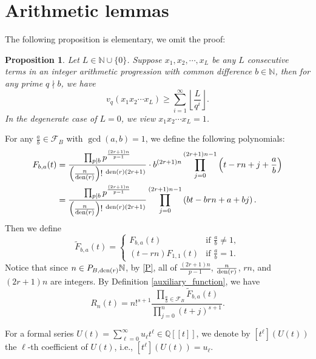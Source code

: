 \documentclass[11pt]{amsart}
\newtheorem{proposition}[theorem]{Proposition}
\numberwithin{equation}{section}
\begin{document}
\section{Arithmetic lemmas}
\label{Arithmetic_lemmas}

The following proposition is elementary, we omit the proof:

\smallskip
\begin{proposition}\label{consecutive_prod}
Let $L \in \mathbb{N} \cup \{ 0 \}$. Suppose $x_1,x_2,\cdots,x_L$ be any $L$ consecutive terms in an integer arithmetic progression with common difference $b \in \mathbb{N}$, then for any prime $q \nmid b$, we have
\[ v_q(x_1x_2\cdots x_L) \geq \sum_{i=1}^{\infty} \left\lfloor \frac{L}{q^i} \right\rfloor .\]
In the degenerate case of $L=0$, we view $x_1x_2\cdots x_L = 1$.
\end{proposition}
\smallskip

For any $\frac{a}{b} \in \mathcal{F}_{B}$ with $\gcd(a,b)=1$, we define the following polynomials:
\begin{align}
F_{b,a}(t) &= \frac{\prod_{p \mid b} p^{\frac{(2r+1)n}{p-1}}}{\left( \frac{n}{{\rm den}(r)} \right)!~^{{\rm den}(r)(2r+1)}}\cdot b^{(2r+1)n} \prod_{j=0}^{(2r+1)n -1} \left( t-rn + j + \frac{a}{b} \right) \nonumber \\
&= \frac{\prod_{p \mid b} p^{\frac{(2r+1)n}{p-1}}}{\left( \frac{n}{{\rm den}(r)} \right)!~^{{\rm den}(r)(2r+1)}} \prod_{j=0}^{(2r+1)n -1} \left( bt-brn + a + bj \right). \label{F_ba}
\end{align}
Then we define
\[ \widetilde{F}_{b,a}(t) = \begin{cases} F_{b,a}(t) &\text{if~} \frac{a}{b} \neq 1, \\ (t-rn)F_{1,1}(t) &\text{if~} \frac{a}{b} = 1. \end{cases} \]
Notice that since $n \in P_{B,{\rm den}(r)}\mathbb{N}$, by \eqref{P}, all of $\frac{(2r+1)n}{p-1}$, $\frac{n}{{\rm den}(r)}$, $rn$, and $(2r+1)n$ are integers. By Definition \ref{auxiliary_function}, we have
\begin{equation}\label{R_equalsto_FFF}
R_n(t) = n!^{s+1} \frac{\prod_{\frac{a}{b} \in \mathcal{F}_{B}}\widetilde{F}_{b,a}(t)}{\prod_{j=0}^{n}(t+j)^{s+1}}.
\end{equation}

For a formal series $U(t) = \sum_{\ell=0}^{\infty} u_{\ell} t^{\ell} \in \mathbb{Q}[[t]]$, we denote by $[t^{\ell}](U(t))$ the $\ell$-th coefficient of $U(t)$, i.e., $[t^{\ell}](U(t)) = u_{\ell}$.
\end{document}
